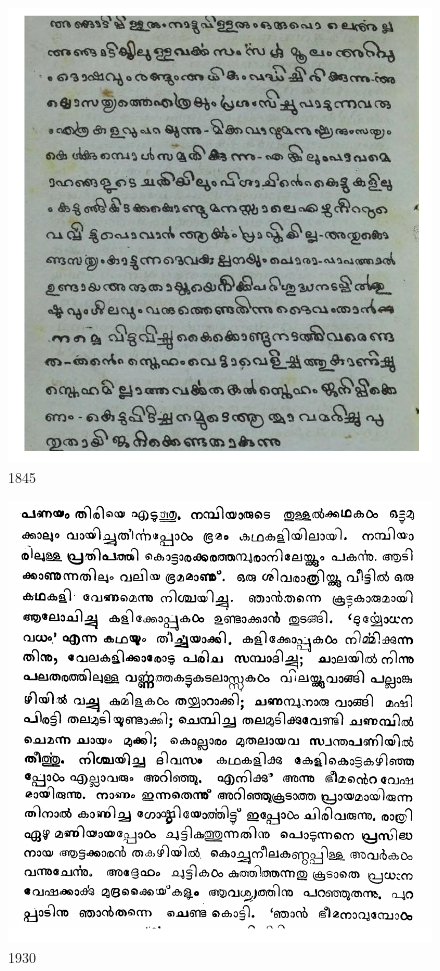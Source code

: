 \documentclass[10pt]{article}
\begin{document}
\begin{figure}[h]
  \centering
   \includegraphics[width=1.0\textwidth]{images/1845-Pazhancholmala-Gundert.png}
     \caption{1845}
\end{figure}

\begin{figure}[h]
  \centering
   \includegraphics[width=1.0\textwidth]{images/1930-Sabdatharavali.png}
     \caption{1930}
\end{figure}
\end{document}
